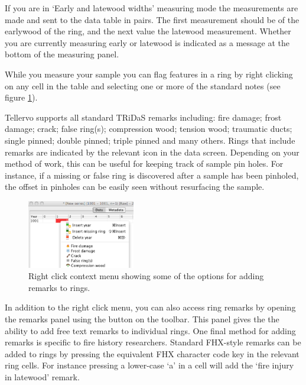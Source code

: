 If you are in `Early and latewood widths' measuring mode the measurements are made and sent to the data table in pairs.  The first measurement should be of the earlywood of the ring, and the next value the latewood measurement.  Whether you are currently measuring early or latewood is indicated as a message at the bottom of the measuring panel.

While you measure your sample you can flag features in a ring by right clicking on any cell in the table and selecting one or more of the standard notes (see figure \ref{fig:ringremarks}).

Tellervo supports all standard TRiDaS remarks including: fire damage; frost damage; crack; false ring(s); compression wood; tension wood; traumatic ducts; single pinned; double pinned; triple pinned and many others.  Rings that include remarks are indicated by the relevant icon in the data screen.  Depending on your method of work, this can be useful for keeping track of sample pin holes.  For instance, if a missing or false ring is discovered after a sample has been pinholed, the offset in pinholes can be easily seen without resurfacing the sample.  

\begin{figure}
  \begin{center}
    \includegraphics[width=0.42\textwidth]{Images/ringremarks.png}
  \end{center}
  \caption{Right click context menu showing some of the options for adding remarks to rings.}
  \label{fig:ringremarks}
\end{figure}

In addition to the right click menu, you can also access ring remarks by opening the remarks panel using the button on the toolbar.  This panel gives the the ability to add free text remarks to individual rings.  One final method for adding remarks is specific to fire history researchers.  Standard FHX-style remarks can be added to rings by pressing the equivalent FHX character code key in the relevant ring cells.  For instance pressing a lower-case `a' in a cell will add the `fire injury in latewood' remark.   

